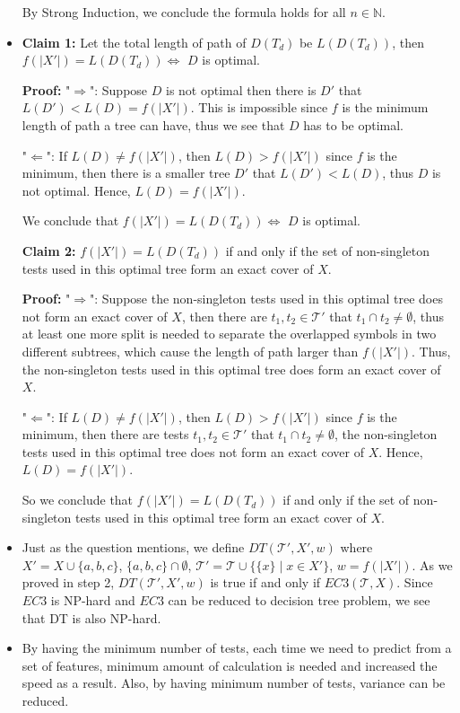 \documentclass[11pt]{article}
\begin{document}
\begin{itemize}
			  By Strong Induction, we conclude the formula holds for all $n \in \mathbb{N}$.
			  \item 
			  \textbf{Claim 1:} Let the total length of path of $D(T_d)$ be $L(D(T_d))$, then $f(|X'|) = L(D(T_d)) \Leftrightarrow$ $D$ is optimal.
			  
			  \textbf{Proof:} "$\Rightarrow$": Suppose $D$ is not optimal then there is $D'$ that $L(D') < L(D) = f(|X'|)$. This is impossible since $f$ is the minimum length of path a tree can have, thus we see that $D$ has to be optimal.
			  
			  "$\Leftarrow$": If $L(D) \neq f(|X'|)$, then $L(D) > f(|X'|)$ since $f$ is the minimum, then there is a smaller tree $D'$ that $L(D') < L(D)$, thus $D$ is not optimal. Hence, $L(D) = f(|X'|)$.
			  
			  We conclude that $f(|X'|) = L(D(T_d)) \Leftrightarrow$ $D$ is optimal.
			  
			  \textbf{Claim 2:} $f(|X'|) = L(D(T_d))$ if and only if  the set of non-singleton tests used in this optimal tree form an exact cover of $X$.
			  
			  \textbf{Proof:} "$\Rightarrow$": Suppose the non-singleton tests used in this optimal tree does not form an exact cover of $X$, then there are $t_1, t_2 \in \mathcal{T}'$ that $t_1 \cap t_2 \neq \emptyset$, thus at least one more split is needed to separate the overlapped symbols in two different subtrees, which cause the length of path larger than $f(|X'|)$. Thus, the non-singleton tests used in this optimal tree does form an exact cover of $X$.
			  
			  "$\Leftarrow$": If $L(D) \neq f(|X'|)$, then $L(D) > f(|X'|)$ since $f$ is the minimum, then there are tests $t_1, t_2 \in \mathcal{T}'$ that $t_1 \cap t_2 \neq \emptyset$, the non-singleton tests used in this optimal tree does not form an exact cover of $X$. Hence, $L(D) = f(|X'|)$.
			  
			  So we conclude that $f(|X'|) = L(D(T_d))$ if and only if  the set of non-singleton tests used in this optimal tree form an exact cover of $X$.
			  	
			  \item Just as the question mentions, we define $DT(\mathcal{T}', X', w)$ where $X' = X \cup \{a, b, c\}$, $\{a, b, c\} \cap \emptyset$, $\mathcal{T}' = \mathcal{T} \cup \{\{x\} \mid x \in X'\}$, $w = f(|X'|)$. As we proved in step 2, $DT(\mathcal{T}', X', w)$ is true if and only if $EC3(\mathcal{T}, X)$. Since $EC3$ is NP-hard and $EC3$ can be reduced to decision tree problem, we see that DT is also NP-hard.
			  \item By having the minimum number of tests, each time we need to predict from a set of features, minimum amount of calculation is needed and increased the speed as a result. Also, by having minimum number of tests, variance can be reduced.
	\end{itemize}
\newpage \nocite{*}


\end{document}

